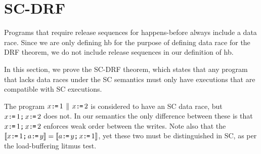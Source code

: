 \section{SC-DRF}

Programs that require release sequences for happens-before always include a
data race.  Since we are only defining hb for the purpose of defining data
race for the DRF theorem, we do not include release sequences in our
definition of hb.

In this section, we prove the SC-DRF theorem, which states that any program
that lacks data races under the SC semantics must only have executions that
are compatible with SC executions.

The program $x\texttt{:}\mkern-1mu\texttt{=}\,1\,\mathbin{\|}\, x\texttt{:}\mkern-1mu\texttt{=}\,2$ is considered to have an SC data race, but
$x\texttt{:}\mkern-1mu\texttt{=}\,1\texttt{;}\, x\texttt{:}\mkern-1mu\texttt{=}\,2$ does not.  In our semantics the only difference
between these is that $x\texttt{:}\mkern-1mu\texttt{=}\,1\texttt{;}\, x\texttt{:}\mkern-1mu\texttt{=}\,2$ enforces weak order between the
writes.  Note also that the
$\llbracket x\texttt{:}\mkern-1mu\texttt{=}\,1\texttt{;}\, a\texttt{:}\mkern-1mu\texttt{=}\, y\rrbracket=\llbracket a\texttt{:}\mkern-1mu\texttt{=}\, y\texttt{;}\, x\texttt{:}\mkern-1mu\texttt{=}\,1\rrbracket$, yet these two must
be distinguished in SC, as per the load-buffering litmus test.

